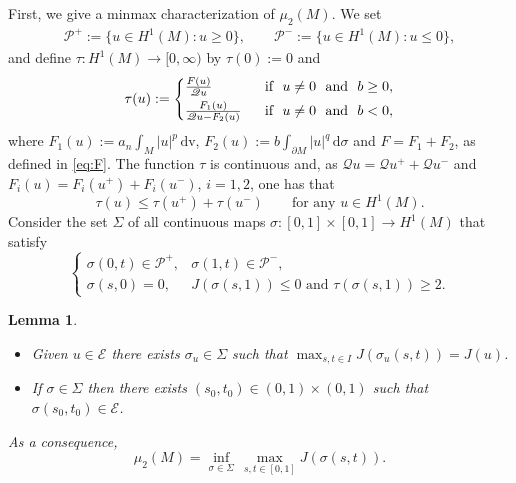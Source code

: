 \documentclass[reqno,11pt,oneside]{amsart}
\newtheorem{lemma}[theorem]{Lemma}
\numberwithin{equation}{section}
\def\im{\int_{M}}
\def\idm{\int_{\partial M}}
\def\cE{\mathcal{E}}
\def\cP{\mathcal{P}}
\def\d{\,\mathrm{d}}
\def\dv{\,\mathrm{dv}}
\begin{document}
First, we give a minmax characterization of $\mu_2(M)$. We set
\begin{align*}
\cP^+:=\{u\in H^1(M):u\geq 0\},\qquad \cP^-:=\{u\in H^1(M):u\leq 0\},
\end{align*}
and define $\tau:H^1(M)\to[0,\infty)$ by $\tau(0):=0$ and
\begin{equation*}
\tau(u):=
\begin{cases}
\frac{F(u)}{\mathscr{Q}u} &\text{ \ if \ }u\neq 0\text{ \ and \ }b\geq 0,\smallskip \\
\frac{F_1(u)}{\mathscr{Q}u-F_2(u)} &\text{ \ if \ }u\neq 0\text{ \ and \ }b<0,
\end{cases}
\end{equation*}
where $F_1(u):=a_n\im |u|^p \dv$, $F_2(u):=b\idm|u|^q\d\sigma$ and $F=F_1+F_2$, as defined in \eqref{eq:F}. The function $\tau$ is continuous and, as $\mathscr{Q}u=\mathscr{Q}u^++\mathscr{Q}u^-$ and $F_i(u)=F_i(u^+)+F_i(u^-)$, $i=1,2$, one has that
\begin{equation}\label{eq:tau}
\tau(u)\leq\tau(u^+)+\tau(u^-)\qquad\text{for any \ }u\in H^1(M).
\end{equation}
Consider the set $\Sigma$ of all continuous maps $\sigma:[0,1]\times[0,1]\to H^1(M)$ that satisfy
\begin{equation*}
\begin{cases}
\sigma(0,t)\in\cP^+, &\sigma(1,t)\in\cP^-,\\
\sigma(s,0)=0, &J(\sigma(s,1))\leq 0\text{ \ and \ }\tau(\sigma(s,1))\geq 2.
\end{cases}
\end{equation*}

\begin{lemma}\label{lem:minmax}
\begin{itemize}
\item[$(a)$]Given $u\in\cE$ there exists $\sigma_u\in\Sigma$ such that $\max_{s,t\in I} J(\sigma_u(s,t))=J(u)$.
\item[$(b)$] If $\sigma\in\Sigma$ then there exists $(s_0,t_0)\in(0,1)\times(0,1)$ such that $\sigma(s_0,t_0)\in\cE$.
\end{itemize}
\smallskip

As a consequence,
$$\mu_2(M)=\inf_{\sigma\in\Sigma}\,\max_{s,t\in[0,1]}J(\sigma(s,t)).$$
\end{lemma}
\end{document}
